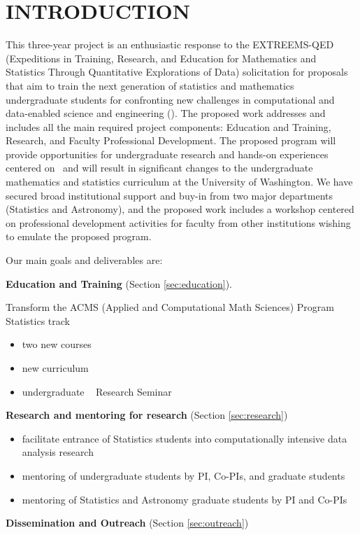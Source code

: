 \section{ INTRODUCTION}

This three-year project is an enthusiastic response to the EXTREEMS-QED (Expeditions in Training, Research, 
and Education for Mathematics and Statistics Through Quantitative Explorations of Data) solicitation for proposals
that aim to train the next generation of statistics and mathematics undergraduate students for confronting new
challenges in computational and data-enabled science and engineering (\cdse).  The proposed work addresses and 
includes all the main required project components: Education and Training, Research, and Faculty Professional 
Development. The proposed program will provide opportunities for undergraduate research and hands-on experiences 
centered on \cdse\ and will result in significant changes to the undergraduate mathematics and statistics curriculum 
at the University of Washington. We have secured broad institutional support and buy-in from two major departments 
(Statistics and Astronomy), and the proposed work includes a workshop centered on professional development activities
for faculty from other institutions wishing to emulate the proposed program. 

\vskip 0.1in Our main goals and deliverables are: 
\bits
\item {\bf Education and Training} (Section \ref{sec:education}).

Transform the ACMS (Applied and Computational Math Sciences) Program Statistics track
\begin{itemize}
  \item two new courses
  \item new curriculum 
  \item undergraduate \cdse~ Research Seminar
  \end{itemize}
\item {\bf Research and mentoring for research} (Section \ref{sec:research})
\begin{itemize}
  \item facilitate entrance of Statistics students into computationally intensive data analysis research
  \item mentoring of undergraduate students by PI, Co-PIs, and graduate students
  \item mentoring of Statistics and Astronomy graduate students by PI and Co-PIs
  \end{itemize}
\item {\bf Dissemination and Outreach} (Section \ref{sec:outreach})

